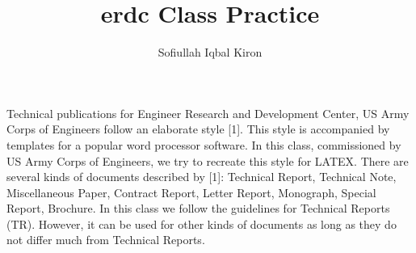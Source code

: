 \documentclass[10pt,a4paper]{erdc}
\author{Sofiullah Iqbal Kiron}
\title{erdc Class Practice}
\begin{document}
\justify

Technical publications for Engineer Research and Development Center, US Army
Corps of Engineers follow an elaborate style [1]. This style is accompanied by
templates for a popular word processor software. In this class, commissioned by
US Army Corps of Engineers, we try to recreate this style for LATEX.
There are several kinds of documents described by [1]: Technical Report, Technical Note, Miscellaneous Paper, Contract Report, Letter Report, Monograph,
Special Report, Brochure. In this class we follow the guidelines for Technical Reports (TR). However, it can be used for other kinds of documents as long as they
do not differ much from Technical Reports.
\end{document}

